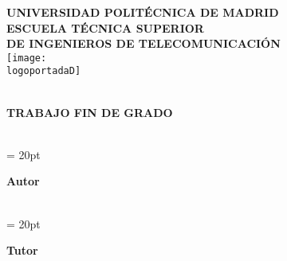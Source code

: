 \newpage
\changepage{2in}{}{}{-0.2in}{}{-0.6in}{}{}{}

	\thispagestyle{empty}
	\begin{center}

	\renewcommand{\baselinestretch}{2.0}

\textbf{\Large UNIVERSIDAD POLIT\'{E}CNICA DE MADRID}\\
\textbf{\large ESCUELA T\'{E}CNICA SUPERIOR \\DE INGENIEROS DE TELECOMUNICACI\'{O}N}\\

	\vspace{1.0cm}
	\texttt{[image: \\logoportadaD]}
	\vspace{0.5cm}

	\textbf{\Large \grado}\\
	\vspace{0.5cm}
	\textbf{TRABAJO FIN DE GRADO}\\

	\vspace{3.5cm}

        \baselineskip=20pt
        \textbf{\textbf{\Large \titulo}}\\

        \vspace{4.5cm}
        \baselineskip = 20pt


        \textbf{\Large Autor} \\
        \textbf{\Large \autor} \\

  \vspace{1cm}

  \baselineskip = 20pt
        
	\textbf{\Large Tutor} \\
  	\textbf{\Large \tutor} \\

  \vspace{1cm}
        \textbf{\Large \fecha} \\

	\end{center}

\afterpage{\blankpage}
